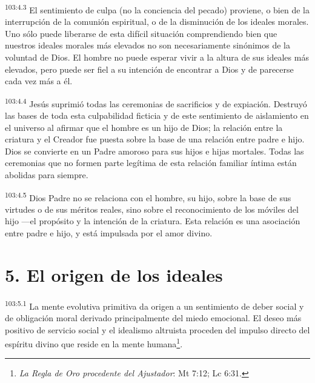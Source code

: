 \par
\textsuperscript{103:4.3} El sentimiento de culpa (no la conciencia del pecado) proviene, o bien de la interrupción de la comunión espiritual, o de la disminución de los ideales morales. Uno sólo puede liberarse de esta difícil situación comprendiendo bien que nuestros ideales morales más elevados no son necesariamente sinónimos de la voluntad de Dios. El hombre no puede esperar vivir a la altura de sus ideales más elevados, pero puede ser fiel a su intención de encontrar a Dios y de parecerse cada vez más a él.

\par
\textsuperscript{103:4.4} Jesús suprimió todas las ceremonias de sacrificios y de expiación. Destruyó las bases de toda esta culpabilidad ficticia y de este sentimiento de aislamiento en el universo al afirmar que el hombre es un hijo de Dios; la relación entre la criatura y el Creador fue puesta sobre la base de una relación entre padre e hijo. Dios se convierte en un Padre amoroso para sus hijos e hijas mortales. Todas las ceremonias que no formen parte legítima de esta relación familiar íntima están abolidas para siempre.

\par
\textsuperscript{103:4.5} Dios Padre no se relaciona con el hombre, su hijo, sobre la base de sus virtudes o de sus méritos reales, sino sobre el reconocimiento de los móviles del hijo ---el propósito y la intención de la criatura. Esta relación es una asociación entre padre e hijo, y está impulsada por el amor divino.

\section*{5. El origen de los ideales}
\par
\textsuperscript{103:5.1} La mente evolutiva primitiva da origen a un sentimiento de deber social y de obligación moral derivado principalmente del miedo emocional. El deseo más positivo de servicio social y el idealismo altruista proceden del impulso directo del espíritu divino que reside en la mente humana\footnote{\textit{La Regla de Oro procedente del Ajustador}: Mt 7:12; Lc 6:31.}.

